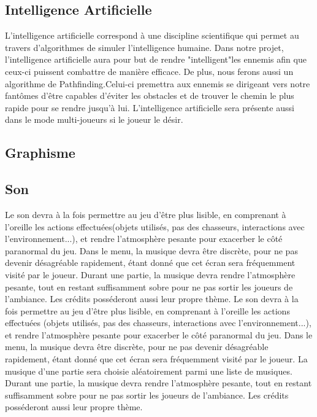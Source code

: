 \documentclass[10pt]{article} %
\begin{document}
\subsection{Intelligence Artificielle}

L'intelligence artificielle correspond à une discipline scientifique qui permet au travers d’algorithmes de simuler l'intelligence humaine. Dans notre projet, l'intelligence artificielle aura pour but de rendre "intelligent"les ennemis afin que ceux-ci puissent combattre de manière efficace. De plus, nous ferons aussi un algorithme de Pathfinding.Celui-ci premettra aux ennemis se dirigeant vers notre fantômes d'être capables d’éviter les obstacles et de trouver le chemin le plus rapide pour se rendre jusqu'à lui. L'intelligence artificielle sera présente aussi dans le mode multi-joueurs si le joueur le désir.

\subsection{Graphisme}



\subsection{Son}

Le son devra à la fois permettre au jeu d'être plus lisible, en comprenant à l'oreille les actions effectuées(objets utilisés, pas des chasseurs, interactions avec l'environnement...), et rendre l'atmosphère pesante pour exacerber le côté paranormal du jeu. Dans le menu, la musique devra être discrète, pour ne pas devenir désagréable rapidement, étant donné que cet écran sera fréquemment visité par le joueur. Durant une partie, la musique devra rendre l'atmosphère pesante, tout en restant suffisamment sobre pour ne pas sortir les joueurs de l'ambiance. Les crédits posséderont aussi leur propre thème.
Le son devra à la fois permettre au jeu d'être plus lisible, en comprenant à l'oreille les actions effectuées (objets utilisés, pas des chasseurs, interactions avec l'environnement...), et rendre l'atmosphère pesante pour exacerber le côté paranormal du jeu. Dans le menu, la musique devra être discrète, pour ne pas devenir désagréable rapidement, étant donné que cet écran sera fréquemment visité par le joueur. La musique d'une partie sera choisie aléatoirement parmi une liste de musiques. Durant une partie, la musique devra rendre l'atmosphère pesante, tout en restant suffisamment sobre pour ne pas sortir les joueurs de l'ambiance. Les crédits posséderont aussi leur propre thème.
\end{document}
